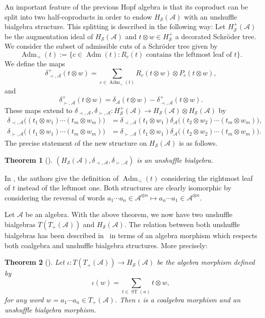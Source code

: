 \documentclass[11pt]{article}
\numberwithin{equation}{section}
\numberwithin{equation}{section}
\newtheorem{Theorem}{Theorem}[section]
\newcommand{\A}{\mathcal{A}}
\newcommand{\ST}{\operatorname{ST}}
\newcommand{\cHS}{H_\mathcal{S}}
\begin{document}
An important feature of the previous Hopf algebra is that its coproduct can be split into two half-coproducts in order to endow $\cHS(\A)$ with an unshuffle bialgebra structure. This splitting is described in the following way: Let $\cHS^+(\A)$ be the augmentation ideal of $\cHS(\A)$ and $t\otimes w \in \cHS^+$ a decorated Schr\"oder tree. We consider the subset of admissible cuts of a Schr\"oder tree given by
\[
	\operatorname{Adm}_\prec(t) := \{c\in \operatorname{Adm}(t)\colon \text{$R_c(t)$ contains the leftmost leaf of $t$}\}.
\]
We define the maps
\[
	\delta^+_{\prec,\A} (t\otimes w)= \sum_{c\in \operatorname{Adm}_\prec(t)} R_c(t\otimes w)\otimes P_c(t\otimes w),
\]
and
\[
	\delta_{\succ,\A}^+(t\otimes w) = \delta_\A(t\otimes w) - \delta_{\prec,\A}^+(t\otimes w).
 \]
These maps extend to $\delta_{\prec,\A},\delta_{\succ,\A} \colon \cHS^+(\A) \to \cHS(\A)\otimes \cHS(\A)$ by
\begin{align*}
	\delta_{\prec,\A}\big((t_1\otimes w_1)\cdots (t_m\otimes w_m)\big)
	&= \delta_{\prec,\A}(t_1\otimes w_1)\delta_\A\big((t_2\otimes w_2)\cdots (t_m\otimes w_m)\big),\\
	\delta_{\succ,\A}\big((t_1\otimes w_1)\cdots (t_m\otimes w_m)\big)
	&= \delta_{\succ,\A}(t_1\otimes w_1)\delta_\A\big((t_2\otimes w_2)\cdots (t_m\otimes w_m)\big).
\end{align*}
The precise statement of the new structure on $\cHS(\A)$ is as follows.

\begin{Theorem}[\cite{JMNT}]
$(\cHS(\A),\delta_{\prec,\A},\delta_{\succ,\A})$ is an unshuffle bialgebra.
\end{Theorem}

\begin{Remark}
In \cite{JMNT}, the authors give the definition of $\operatorname{Adm}_\prec(t)$ considering the rightmost leaf of $t$ instead of the leftmost one. Both structures are clearly isomorphic by considering the reversal of words $a_1\cdots a_n \in \A^{\otimes n}\mapsto a_n\cdots a_1 \in \A^{\otimes n}$.
\end{Remark}

Let $\A$ be an algebra. With the above theorem, we now have two unshuffle bialgebras $T(T_+(\A))$ and $\cHS(\A)$. The relation between both unshuffle bialgebras has been described in~\cite{JMNT} in terms of an algebra morphism which respects both coalgebra and unshuffle bialgebra structures. More precisely:

\begin{Theorem}[\cite{JMNT}]
Let $\iota\colon T(T_+(\A))\to \cHS(\A)$ be the algebra morphism defined by
\begin{equation}\label{eq:iota}
	\iota(w) = \sum_{t\in \ST(n)} t\otimes w,
\end{equation}
for any word $w= a_1\cdots a_n \in T_+(\A)$. Then $\iota$ is a coalgebra morphism and an unshuffle bialgebra morphism.
\end{Theorem}
\end{document}

